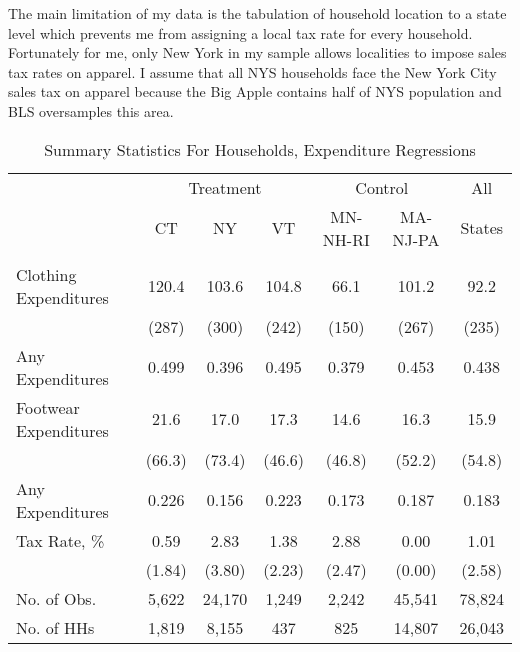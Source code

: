 \documentclass[12pt]{article}
\begin{document}
	The main limitation of my data is the tabulation of household location to a state level which prevents me from assigning a local tax rate for every household. Fortunately for me, only New York in my sample allows localities to impose sales tax rates on apparel. I assume that all NYS households face the New York City sales tax on apparel because the Big Apple contains half of NYS population and BLS oversamples this area.
	
	\begin{table}
		\caption  { Summary Statistics For Households, Expenditure Regressions}
		\label{table:sumexp}
		\centering
		\begin{threeparttable}
			\begin{tabular}{lcccccc}
				
				\hline  &  \multicolumn{3}{c}{Treatment} & \multicolumn{2}{c}{Control} & All\\
				& CT & NY & VT & MN-NH-RI & MA-NJ-PA & States\\
				\hline & & & & & & \\
			Clothing Expenditures & 120.4 & 103.6 & 104.8 & 66.1 & 101.2 & 92.2\\
			& (287) & (300) & (242) & (150) & (267) & (235)\\
			Any Expenditures & 0.499 & 0.396 & 0.495 & 0.379 & 0.453 & 0.438\\
			Footwear Expenditures & 21.6 & 17.0 & 17.3 & 14.6 & 16.3 & 15.9\\
			& (66.3) & (73.4) & (46.6) & (46.8) & (52.2) & (54.8)\\
			Any Expenditures & 0.226 & 0.156 & 0.223 & 0.173 & 0.187 & 0.183\\
			Tax Rate, \% & 0.59 & 2.83 & 1.38 & 2.88 & 0.00 & 1.01\\
			& (1.84) & (3.80) & (2.23) & (2.47) & (0.00) & (2.58)\\
			No. of Obs. & 5,622 & 24,170 & 1,249 & 2,242 & 45,541 & 78,824\\
			No. of HHs & 1,819 & 8,155 & 437 & 825 & 14,807 & 26,043\\
				\hline
			\end{tabular}
			\begin{tablenotes}

\end{tablenotes}
\end{threeparttable}
\end{table}
\end{document}
